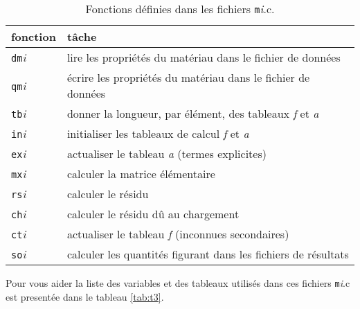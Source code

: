 \documentclass[a4paper,11pt]{article}
\begin{document}
\begin{table}[ht]
\begin{center}
\begin{tabular}{|l|l|}
\hline
fonction & t\^ache\\ \hline\hline
{\tt dm}\textit{i} & lire les propri\'et\'es du mat\'eriau dans le fichier de donn\'ees\\ \hline
{\tt qm}\textit{i} & \'ecrire les propri\'et\'es du mat\'eriau dans le fichier de donn\'ees \\ \hline
{\tt tb}\textit{i} & donner la longueur, par \'el\'ement, des tableaux \textit{f} et \textit{a}\\ \hline
{\tt in}\textit{i} & initialiser les tableaux de calcul \textit{f} et \textit{a}\\ \hline
{\tt ex}\textit{i} & actualiser le tableau \textit{a} (termes explicites)\\ \hline
{\tt mx}\textit{i} & calculer la matrice \'el\'ementaire\\ \hline
{\tt rs}\textit{i} & calculer le r\'esidu\\ \hline
{\tt ch}\textit{i} & calculer le r\'esidu d\^u au chargement\\ \hline
{\tt ct}\textit{i} & actualiser le tableau \textit{f} (inconnues secondaires)\\ \hline
{\tt so}\textit{i} & calculer les quantit\'es figurant dans les fichiers de r\'esultats\\ \hline
\end{tabular}
\end{center}
\caption{Fonctions d\'efinies dans les fichiers {\tt m}\textit{i}.c.}
\label{tab:t2}
\end{table}

Pour vous aider la liste des variables et des tableaux utilis\'es dans ces fichiers {\tt m}\textit{i}.c est present\'ee dans le tableau \ref{tab:t3}.
\end{document}
